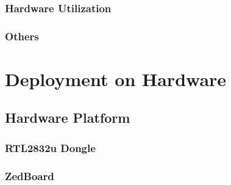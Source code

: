   \subsection{Hardware Utilization}
  \subsection{Others}


\chapter{Deployment on Hardware}
  \section{Hardware Platform}
    \subsection{RTL2832u Dongle}
    \subsection{ZedBoard}
